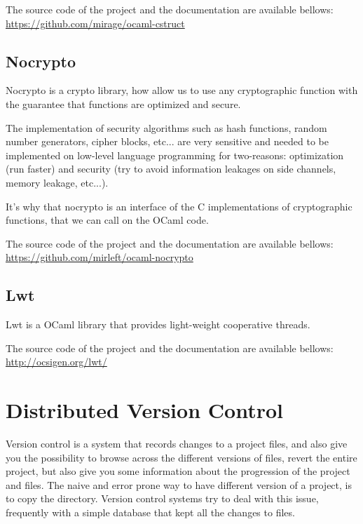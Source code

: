 \documentclass[10pt,a4paper]{report}
\begin{document}
The source code of the project and the documentation are available bellows: \newline
\href{https://github.com/mirage/ocaml-cstruct}{https://github.com/mirage/ocaml-cstruct}

\section{Nocrypto}

Nocrypto is a crypto library, how allow us to use any cryptographic function with the guarantee that functions are optimized and secure.\newline

The implementation of security algorithms such as hash functions, random number generators, cipher blocks, etc... are very sensitive and needed to be implemented on low-level language programming for two-reasons: optimization (run faster) and security (try to avoid information leakages on side channels, memory leakage, etc...). \newline

It's why that nocrypto is an interface of the C implementations of cryptographic functions, that we can call on the OCaml code.

The source code of the project and the documentation are available bellows: \newline
\href{https://github.com/mirleft/ocaml-nocrypto}{https://github.com/mirleft/ocaml-nocrypto}

\section{Lwt}

Lwt is a OCaml library that provides light-weight cooperative threads. 

The source code of the project and the documentation are available bellows: \newline
\href{http://ocsigen.org/lwt/}{http://ocsigen.org/lwt/}

\chapter{Distributed Version Control}

Version control is a system that records changes to a project files, and also give you the possibility to browse across the different versions of files, revert the entire project, but also give you some information about the progression of the project and files. The naive and error prone way to have different version of a project, is to copy the directory.
Version control systems try to deal with this issue, frequently with a simple database that kept all the changes to files. \newline
\end{document}
